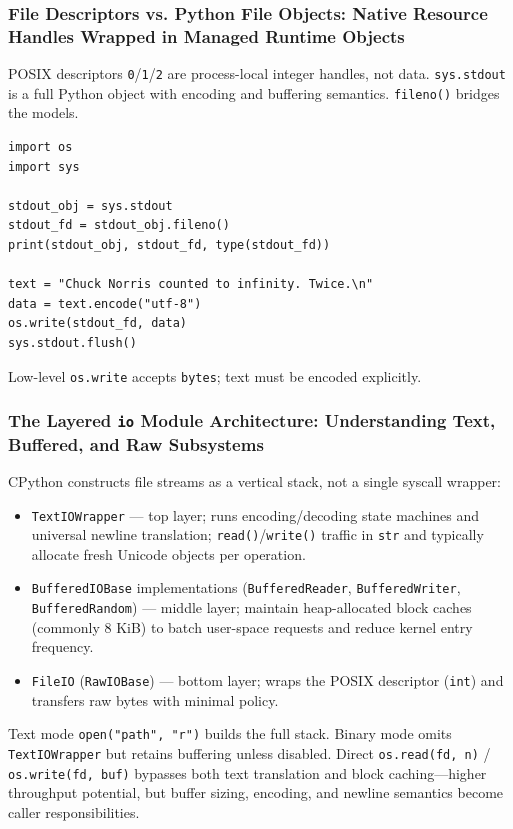 \documentclass[a4paper,twoside]{report}
\begin{document}
\subsubsection{File Descriptors vs. Python File Objects: Native Resource Handles Wrapped in Managed Runtime Objects}

POSIX descriptors \texttt{0}/\texttt{1}/\texttt{2} are process-local integer handles, not data. \texttt{sys.stdout} is a full Python object with encoding and buffering semantics. \texttt{fileno()} bridges the models.

\begin{verbatim}
import os
import sys

stdout_obj = sys.stdout
stdout_fd = stdout_obj.fileno()
print(stdout_obj, stdout_fd, type(stdout_fd))

text = "Chuck Norris counted to infinity. Twice.\n"
data = text.encode("utf-8")
os.write(stdout_fd, data)
sys.stdout.flush()
\end{verbatim}

Low-level \texttt{os.write} accepts \texttt{bytes}; text must be encoded explicitly.

\subsubsection{The Layered \texttt{io} Module Architecture: Understanding Text, Buffered, and Raw Subsystems}

CPython constructs file streams as a vertical stack, not a single syscall wrapper:

\begin{itemize}
    \item \texttt{TextIOWrapper} --- top layer; runs encoding/decoding state machines and universal newline translation; \texttt{read()}/\texttt{write()} traffic in \texttt{str} and typically allocate fresh Unicode objects per operation.
    \item \texttt{BufferedIOBase} implementations (\texttt{BufferedReader}, \texttt{BufferedWriter}, \texttt{BufferedRandom}) --- middle layer; maintain heap-allocated block caches (commonly 8 KiB) to batch user-space requests and reduce kernel entry frequency.
    \item \texttt{FileIO} (\texttt{RawIOBase}) --- bottom layer; wraps the POSIX descriptor (\texttt{int}) and transfers raw bytes with minimal policy.
\end{itemize}

Text mode \texttt{open("path", "r")} builds the full stack. Binary mode omits \texttt{TextIOWrapper} but retains buffering unless disabled. Direct \texttt{os.read(fd, n)} / \texttt{os.write(fd, buf)} bypasses both text translation and block caching---higher throughput potential, but buffer sizing, encoding, and newline semantics become caller responsibilities.
\end{document}

